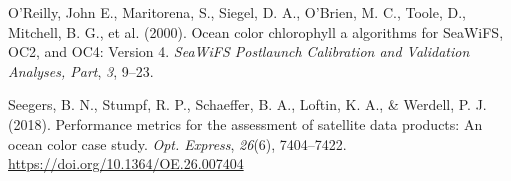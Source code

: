 \documentclass[
]{agujournal2019}
\newlength{\cslhangindent}
\newenvironment{CSLReferences}[2] %
 {\begin{list}{}{%
  \setlength{\itemindent}{0pt}
  \setlength{\leftmargin}{0pt}
  \setlength{\parsep}{0pt}
  \ifodd #1
   \setlength{\leftmargin}{\cslhangindent}
   \setlength{\itemindent}{-1\cslhangindent}
  \fi
  \setlength{\itemsep}{#2\baselineskip}}}
 {\end{list}}
\begin{document}
\begin{CSLReferences}{1}{0}
O'Reilly, John E., Maritorena, S., Siegel, D. A., O'Brien, M. C., Toole,
D., Mitchell, B. G., et al. (2000). Ocean color chlorophyll a algorithms
for SeaWiFS, OC2, and OC4: Version 4. \emph{SeaWiFS Postlaunch
Calibration and Validation Analyses, Part}, \emph{3}, 9--23.

Seegers, B. N., Stumpf, R. P., Schaeffer, B. A., Loftin, K. A., \&
Werdell, P. J. (2018). Performance metrics for the assessment of
satellite data products: An ocean color case study. \emph{Opt. Express},
\emph{26}(6), 7404--7422. \url{https://doi.org/10.1364/OE.26.007404}

\end{CSLReferences}
\end{document}
